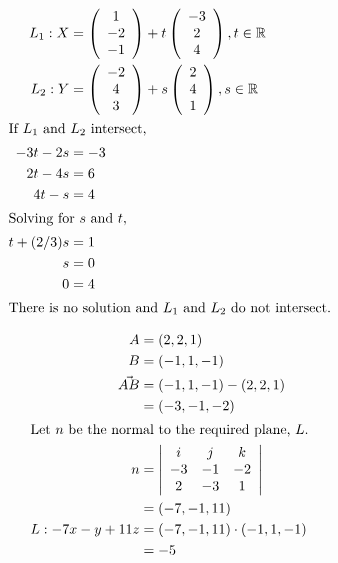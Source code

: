 \documentclass[12pt]{article}
\newenvironment{problem}[2][Problem]{\begin{trivlist}
\item[\hskip \labelsep {\bfseries #1}\hskip \labelsep {\bfseries #2.}]}{\end{trivlist}}
\begin{document}
\begin{problem}{2.b}
\end{problem}
\begin{align*}
L_1 : X &= 
\left( \begin{array}{c}
	1\\
	-2\\
	-1\\
\end{array} \right)
+ t
\left( \begin{array}{c}
	-3\\
	2\\
	4\\
\end{array} \right)
, 
t \in \mathbb{R} \\
L_2 : Y &= 
\left( \begin{array}{c}
	-2\\
	4\\
	3\\
\end{array} \right)
+ s
\left( \begin{array}{c}
	2\\
	4\\
	1\\
\end{array} \right)
, 
s \in \mathbb{R} \\
\intertext{If $L_1$ and $L_2$ intersect,}
-3t - 2s &= -3 \\
2t - 4s &= 6 \\
4t - s &= 4\\
\intertext{Solving for $s$ and $t$,}
t + (2/3)s &= 1 \\
s &= 0\\
0 &= 4 \\
\intertext{There is no solution and $L_1$ and $L_2$ do not intersect.}
\end{align*}
\filbreak

\begin{problem}{3}
\end{problem}
\begin{align*}
A &= (2, 2, 1)  \\
B &= (-1, 1, -1)  \\
\vec{AB} &= (-1, 1, -1) - (2, 2, 1)  \\
&= (-3, -1, -2)  \\
\intertext{Let $n$ be the normal to the required plane, $L$.}
n &= \left| \begin{array}{ccc}
	i & j & k\\
	-3 & -1 & -2\\
	2 & -3 & 1\\
\end{array} \right| \\
&= (-7, -1, 11)  \\
L : 
-7x -y +11z &= (-7, -1, 11) \cdot (-1, 1, -1)  \\
&= -5
\end{align*}
\filbreak
\end{document}
